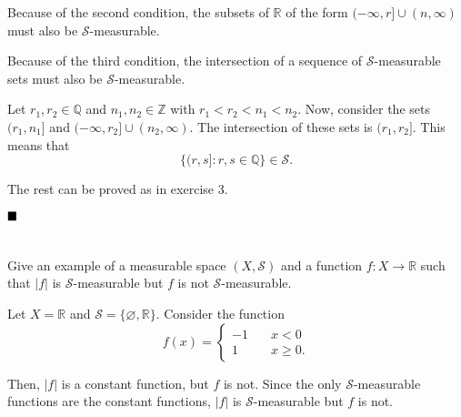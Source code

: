 \documentclass[11pt, a4paper, tikz]{article}
\newcommand{\centsection}[1]{
	\section*{\centering{#1}}
}
\renewcommand{\qed}{\hfill\blacksquare}
\newcommand{\integers}{
	\ensuremath{\mathbb{Z}}
}
\newcommand{\rationals}{
	\ensuremath{\mathbb{Q}}
}
\newcommand{\reals}{
	\ensuremath{\mathbb{R}}
}
\newcommand{\sigmaAlgebra}[1]{
	\ensuremath{\mathcal{#1}}
}
\begin{document}
	Because of the second condition, the subsets of $\reals$ of the form $(-\infty, r]\cup(n, \infty)$ must also be $\sigmaAlgebra{S}$-measurable.
	
	Because of the third condition, the intersection of a sequence of $\sigmaAlgebra{S}$-measurable sets must also be $\sigmaAlgebra{S}$-measurable.
	
	Let $r_1, r_2\in\rationals$ and $n_1, n_2\in\integers$ with $r_1 < r_2 < n_1 < n_2$. Now, consider the sets $(r_1, n_1]$ and $(-\infty, r_2]\cup(n_2, \infty)$. The intersection of these sets is $(r_1, r_2]$. This means that \[\{(r,s]:r,s\in\rationals\}\in\sigmaAlgebra{S}.\]
	
	The rest can be proved as in exercise 3.
	
	$\qed$
	
	\centsection{Exercise 9}
	
	\begin{formulationBox}
		Give an example of a measurable space $(X, \sigmaAlgebra{S})$ and a function $f:X\rightarrow\reals$ such that $|f|$ is $\sigmaAlgebra{S}$-measurable but $f$ is not $\sigmaAlgebra{S}$-measurable.
	\end{formulationBox}

	Let $X=\reals$ and $\sigmaAlgebra{S} = \{\varnothing, \reals\}$. Consider the function
	\[
		f(x) = \begin{cases}
			-1 &\quad x<0\\
			1 &\quad x\geq0.
		\end{cases}
	\]
	
	Then, $|f|$ is a constant function, but $f$ is not. Since the only $\sigmaAlgebra{S}$-measurable functions are the constant functions, $|f|$ is $\sigmaAlgebra{S}$-measurable but $f$ is not.
\end{document}
